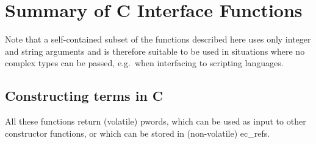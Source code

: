 %
% 
% 
% 
% 
%
%

\chapter{Summary of C Interface Functions}
\label{chapsumc}
Note that a self-contained subset of the functions described here
uses only integer and string arguments and is therefore suitable
to be used in situations where no complex types can be passed,
e.g.\ when interfacing to scripting languages.

\section{Constructing {\eclipse} terms in C}
All these functions return (volatile) pwords, which can be used as input
to other constructor functions, or which can be stored in (non-volatile)
ec_refs.

